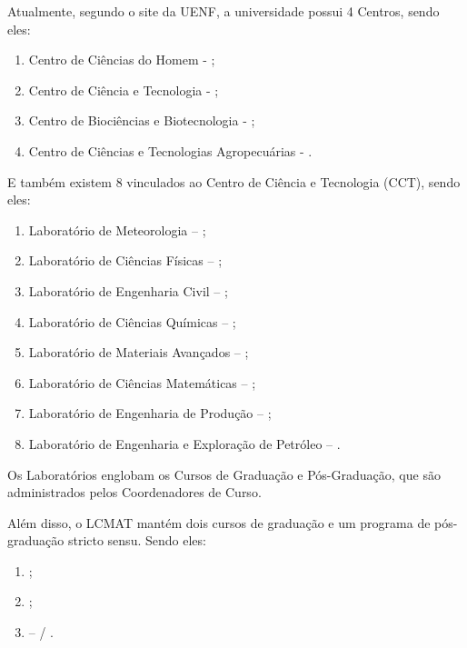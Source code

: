 Atualmente, segundo o site da UENF, a universidade possui 4 Centros, sendo eles:

\begin{enumerate}
  \item Centro de Ciências do Homem - ;
  \item Centro de Ciência e Tecnologia - ;
  \item Centro de Biociências e Biotecnologia - ;
  \item Centro de Ciências e Tecnologias Agropecuárias - .
\end{enumerate}

E também existem 8  vinculados ao Centro de Ciência e Tecnologia (CCT), sendo eles:

\begin{enumerate}
  \item Laboratório de Meteorologia – ;
  \item Laboratório de Ciências Físicas – ;
  \item Laboratório de Engenharia Civil – ;
  \item Laboratório de Ciências Químicas – ;
  \item Laboratório de Materiais Avançados – ;
  \item Laboratório de Ciências Matemáticas – ;
  \item Laboratório de Engenharia de Produção – ;
  \item Laboratório de Engenharia e Exploração de Petróleo – .
\end{enumerate}

Os Laboratórios englobam os Cursos de Graduação e Pós-Graduação, que são administrados pelos Coordenadores de Curso.

Além disso, o LCMAT mantém dois cursos de graduação e um programa de pós-graduação stricto sensu. Sendo eles:

\begin{enumerate}
  \item {};
  \item {};
  \item {} –  / .
\end{enumerate}

